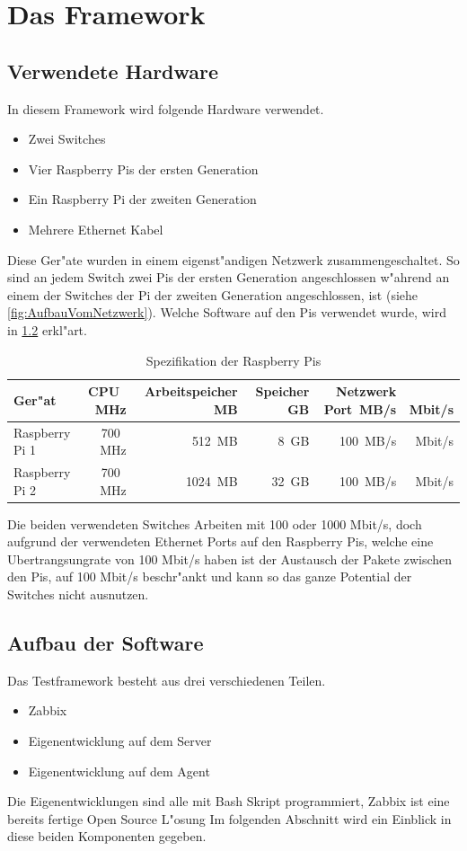 \chapter{Das Framework}
\label{cha:framework}
\section{Verwendete Hardware} \label{sec:verwendeteHardware}

In diesem Framework wird folgende Hardware verwendet.

\begin{itemize}
\item Zwei Switches
\item Vier Raspberry Pis der ersten Generation
\item Ein Raspberry Pi der zweiten Generation
\item Mehrere Ethernet Kabel
\end{itemize}

Diese Ger"ate wurden in einem eigenst"andigen Netzwerk zusammengeschaltet. So sind an jedem Switch zwei Pis %
der ersten Generation angeschlossen w"ahrend an einem der Switches der Pi der zweiten Generation angeschlossen, %
ist (siehe \cref{fig:AufbauVomNetzwerk}). Welche Software auf den Pis verwendet wurde, wird in \cref{sec:aufbauSoftware} erkl"art. 

\begin{table}
\centering
\begin{tabular}{l%
 r<{\,MHz}%
 r<{\,MB}%
 r<{\,GB}%
 r<{\,MB/s}%
 r<{\,Mbit/s}%
}
Ger"at 		& CPU	& Arbeitspeicher	& Speicher	& Netzwerk Port	\\
\hline
Raspberry Pi 1	& 700	& 512			& 8		& 100		\\
Raspberry Pi 2 	& 700 	& 1024			& 32		& 100		\\

\end{tabular}
\caption{Spezifikation der Raspberry Pis}
\label{tab:hardwarespezifiktion}
\end{table}


Die beiden verwendeten Switches Arbeiten mit 100 oder 1000 Mbit/s, doch aufgrund %
der verwendeten Ethernet Ports auf den Raspberry Pis, welche eine Ubertrangsungrate von 100 Mbit/s haben %
ist der Austausch der Pakete zwischen den Pis, auf 100 Mbit/s beschr"ankt und kann so das ganze Potential der %
Switches nicht ausnutzen. %


 
\section{Aufbau der Software} \label{sec:aufbauSoftware}
Das Testframework besteht aus drei verschiedenen Teilen. %
\begin{itemize}
\item Zabbix %
\item Eigenentwicklung auf dem Server %
\item Eigenentwicklung auf dem Agent %
\end{itemize}
Die Eigenentwicklungen sind alle mit Bash Skript programmiert, Zabbix ist eine bereits fertige Open Source L"osung %
Im folgenden Abschnitt wird ein Einblick in diese beiden Komponenten gegeben. %

